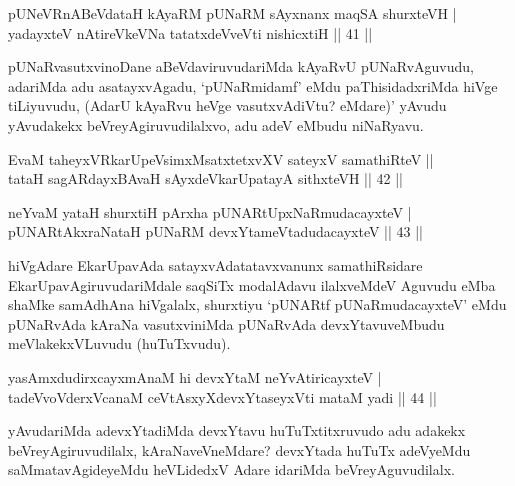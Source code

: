 
\begin{shl}
pUNeVRnABeVdataH kAyaRM pUNaRM sAyxnanx maqSA shurxteVH  | \\
yadayxteV nAtireVkeVNa tatatxdeVveVti nishicxtiH \hfill||  41 ||  
\end{shl}

\begin{artha}
pUNaRvasutxvinoDane aBeVdaviruvudariMda kAyaRvU pUNaRvAguvudu, adariMda adu asatayxvAgadu, `pUNaRmidamf' eMdu paThisidadxriMda hiVge tiLiyuvudu, (AdarU kAyaRvu heVge vasutxvAdiVtu? eMdare)' yAvudu yAvudakekx beVreyAgiruvudilalxvo, adu adeV eMbudu niNaRyavu.
\end{artha}


\begin{shl}
EvaM taheyxVRkarUpeV\s simxMsatxtetxvXV sateyxV samathiRteV ||  \\
tataH sagARdayxBAvaH sAyxdeVkarUpatayA sithxteVH \hfill||  42 ||  
\end{shl}

\begin{shl}
neYvaM yataH shurxtiH pArxha pUNARtUpxNaRmudacayxteV  | \\
pUNARtAkxraNataH pUNaRM devxYtameVtadudacayxteV \hfill||  43 ||  
\end{shl}

\begin{artha}
hiVgAdare EkarUpavAda satayxvAdatatavxvanunx samathiRsidare EkarUpavAgiruvudariMdale saqSiTx modalAdavu ilalxveMdeV Aguvudu \mdash  eMba shaMke \mdash  samAdhAna \mdash  hiVgalalx, shurxtiyu `pUNARtf pUNaRmudacayxteV' eMdu pUNaRvAda kAraNa vasutxviniMda pUNaRvAda devxYtavuveMbudu meVlakekxVLuvudu (huTuTxvudu).
\end{artha}



\begin{shl}
yasAmxdudirxcayxmAnaM hi devxYtaM neYvAtiricayxteV  | \\
tadeVvoVderxVcanaM ceVtAsxyXdevxYtaseyxVti mataM yadi \hfill||  44 ||  
\end{shl}

\begin{artha}
yAvudariMda adevxYtadiMda devxYtavu huTuTxtitxruvudo adu adakekx beVreyAgiruvudilalx, kAraNaveVneMdare? devxYtada huTuTx adeVyeMdu saMmatavAgideyeMdu heVLidedxV Adare idariMda beVreyAguvudilalx.
\end{artha}

